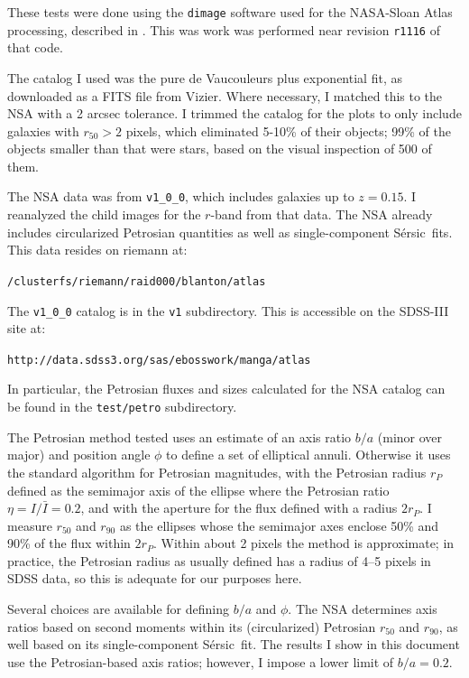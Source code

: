 \documentclass[10pt,preprint]{aastex}
\newcommand{\Sersic}{S\'ersic}
\begin{document}
These tests were done using the {\tt dimage} software used for the
NASA-Sloan Atlas processing, described in \citet{blanton11a}. This was
work was performed near revision {\tt r1116} of that code.

The \citet{simard11a} catalog I used was the pure de Vaucouleurs plus
exponential fit, as downloaded as a FITS file from Vizier. Where
necessary, I matched this to the NSA with a 2 arcsec tolerance. I
trimmed the \citet{simard11a} catalog for the plots to only include
galaxies with $r_{50}>2$ pixels, which eliminated 5-10\% of their
objects; 99\% of the objects smaller than that were stars, based on
the visual inspection of 500 of them.

The NSA data was from {\tt v1\_0\_0}, which includes galaxies up to
$z=0.15$. I reanalyzed the child images for the $r$-band from that
data. The NSA already includes circularized Petrosian quantities as
well as single-component \Sersic\ fits. This data resides on riemann
at:
\begin{center}
{\tt /clusterfs/riemann/raid000/blanton/atlas} 
\end{center}
The {\tt v1\_0\_0} catalog is in the {\tt v1} subdirectory. This is
accessible on the SDSS-III site at:
\begin{center}
{\tt http://data.sdss3.org/sas/ebosswork/manga/atlas}
\end{center}
In particular, the Petrosian fluxes and sizes calculated for the NSA
catalog can be found in the {\tt test/petro} subdirectory.

The Petrosian method tested uses an estimate of an axis ratio $b/a$
(minor over major) and position angle $\phi$ to define a set of
elliptical annuli. Otherwise it uses the standard algorithm for
Petrosian magnitudes, with the Petrosian radius $r_P$ defined as the
semimajor axis of the ellipse where the Petrosian ratio $\eta= I/\bar
I = 0.2$, and with the aperture for the flux defined with a radius
$2r_P$. I measure $r_{50}$ and $r_{90}$ as the ellipses whose the
semimajor axes enclose 50\% and 90\% of the flux within $2r_P$. Within
about 2 pixels the method is approximate; in practice, the Petrosian
radius as usually defined has a radius of 4--5 pixels in SDSS data, so
this is adequate for our purposes here.

Several choices are available for defining $b/a$ and $\phi$. The NSA
determines axis ratios based on second moments within its
(circularized) Petrosian $r_{50}$ and $r_{90}$, as well based on its
single-component \Sersic\ fit. The results I show in this document use
the Petrosian-based axis ratios; however, I impose a lower limit of
$b/a=0.2$.
\end{document}
